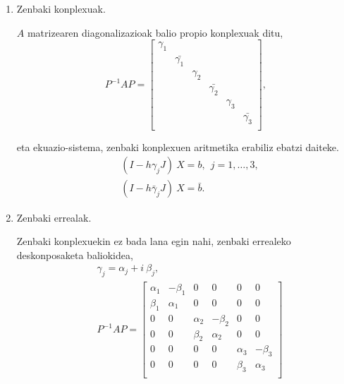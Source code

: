 \begin{enumerate}
\item Zenbaki konplexuak.

$A$ matrizearen diagonalizazioak balio propio konplexuak ditu, 
\begin{equation*}
P^{-1}AP=\begin{bmatrix}
  \gamma_1 &                &          &                &           &                 \\
           & \bar{\gamma_1} &          &                &           &                 \\
           &                & \gamma_2 &                &           &                 \\
           &                &          & \bar{\gamma_2} &           &                 \\ 
           &                &          &                & \gamma_3   &                 \\
           &                &          &                &            & \bar{\gamma_3} \\  
\end{bmatrix},
\end{equation*}

eta ekuazio-sistema, zenbaki konplexuen aritmetika erabiliz ebatzi daiteke.
\begin{align*}
&(I-h \gamma_j J) \ X = b, \ \ j=1,\dots,3, \\
&(I-h \bar{\gamma}_j J) \ X = \bar{b}. 
\end{align*}

\item Zenbaki errealak.

Zenbaki konplexuekin ez bada lana egin nahi, zenbaki errealeko deskonposaketa baliokidea,
\begin{align*}
&\gamma_j=\alpha_j + i \ \beta_j,\\
&P^{-1}AP=\begin{bmatrix}
\alpha_{1} & -\beta_{1}   &  0            &  0            &  0           &    0       \\
\beta_{1}  & \alpha_{1}   & 0             &  0            &  0           &    0       \\
 0          & 0             & \alpha_{2}  & -\beta_{2}    &  0           &    0       \\
 0          & 0             & \beta_{2}   & \alpha_{2}    &  0           &    0       \\
 0          & 0             &  0          & 0             & \alpha_{3}  & -\beta_{3}  \\
 0          & 0             &  0          & 0             & \beta_{3}   & \alpha_{3}  \\
\end{bmatrix}
\end{align*}

\end{enumerate}

